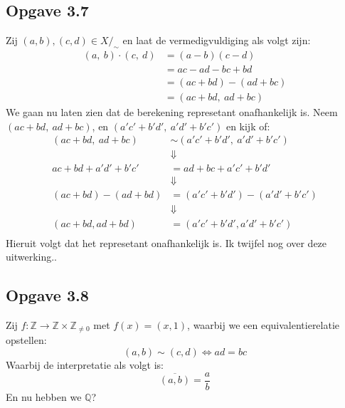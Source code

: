 \documentclass{article}
\newcommand{\Z}{\mathbb{Z}}
\newcommand{\q}{/_\sim}
\newcommand{\ol}[1]{\overline{#1}}
\begin{document}
\subsection*{Opgave 3.7}
Zij $(a, b), (c, d) \in X\q$ en laat de vermedigvuldiging als volgt zijn:
\begin{align*}
	(a, \ b)\cdot(c, \ d) &= (a-b)(c-d) \\
	&= ac - ad - bc + bd \\
	&= (ac + bd) - (ad + bc) \\
	&= (ac + bd, \ ad + bc)
\end{align*}
We gaan nu laten zien dat de berekening represetant onafhankelijk is.
Neem $(ac + bd, \ ad + bc)$, en $(a'c' + b'd', \ a'd'+b'c')$ en kijk of:
\begin{align*}
(ac + bd, \ ad + bc) &\sim (a'c' + b'd', \ a'd' + b'c') \\
&\Downarrow \\ 
ac + bd + a'd' + b'c' &= ad + bc + a'c' + b'd' \\
&\Downarrow \\
(ac + bd) - (ad + bd) &= (a'c' + b'd') - (a'd' + b'c') \\
&\Downarrow \\
(ac + bd, ad + bd) &= (a'c' + b'd', a'd' + b'c') \\
\end{align*}
Hieruit volgt dat het represetant onafhankelijk is. Ik twijfel nog over deze uitwerking..

\subsection*{Opgave 3.8}
Zij $f: \Z \rightarrow \Z \times \Z_{\neq 0}$ met $f(x) = (x, 1)$, waarbij we een equivalentierelatie opstellen:
\[(a, b) \sim (c, d) \Longleftrightarrow ad = bc\] 
Waarbij de interpretatie als volgt is:
\[\ol{(a, b)} = \frac{a}{b}\]
En nu hebben we $\mathbb{Q}$?
\end{document}
